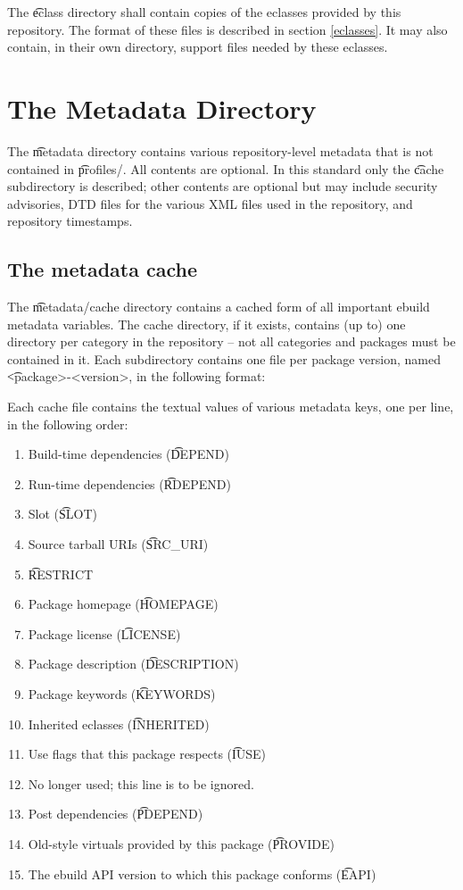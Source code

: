 The \t{eclass} directory shall contain copies of the eclasses provided by this repository. The
format of these files is described in section \ref{eclasses}. It may also contain, in their own
directory, support files needed by these eclasses.

\section{The Metadata Directory}
\label{metadata-dir}

The \t{metadata} directory contains various repository-level metadata that is not contained in
\t{profiles/}. All contents are optional. In this standard only the \t{cache} subdirectory is
described; other contents are optional but may include security advisories, DTD files for the
various XML files used in the repository, and repository timestamps.

\subsection{The metadata cache}

The \t{metadata/cache} directory contains a cached form of all important ebuild metadata variables.
The cache directory, if it exists, contains (up to) one directory per category in the repository --
not all categories and packages must be contained in it. Each subdirectory contains one file per
package version, named \t{<package>-<version>}, in the following format:

Each cache file contains the textual values of various metadata keys, one per line, in the following
order:
\begin{enumerate}
\item Build-time dependencies (\t{DEPEND})
\item Run-time dependencies (\t{RDEPEND})
\item Slot (\t{SLOT})
\item Source tarball URIs (\t{SRC\_URI})
\item \t{RESTRICT}
\item Package homepage (\t{HOMEPAGE})
\item Package license (\t{LICENSE})
\item Package description (\t{DESCRIPTION})
\item Package keywords (\t{KEYWORDS})
\item Inherited eclasses (\t{INHERITED})
\item Use flags that this package respects (\t{IUSE})
\item No longer used; this line is to be ignored.
\item Post dependencies (\t{PDEPEND})
\item Old-style virtuals provided by this package (\t{PROVIDE})
\item The ebuild API version to which this package conforms (\t{EAPI})
\end{enumerate}

